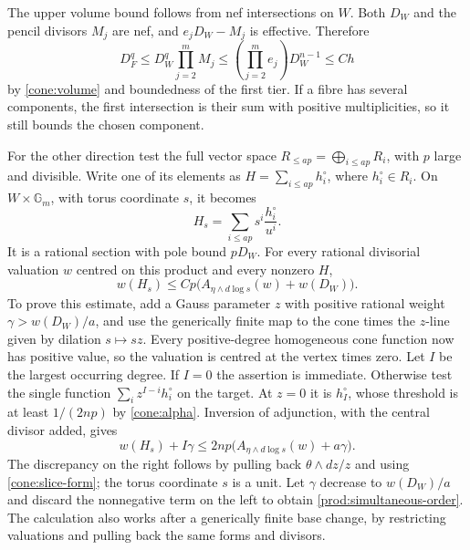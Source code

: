 The upper volume bound follows from nef intersections on $W$.
Both $D_W$ and the pencil divisors $M_j$ are nef, and
$e_jD_W-M_j$ is effective.  Therefore
\[
 D_F^q\leq D_W^q\prod_{j=2}^m M_j
 \leq\left(\prod_{j=2}^m e_j\right)D_W^{n-1}
 \leq Ch
\]
by \eqref{cone:volume} and boundedness of the first tier.  If a fibre
has several components, the first intersection is their sum with
positive multiplicities, so it still bounds the chosen component.

For the other direction test the full vector space
$R_{\leq ap}=\bigoplus_{i\leq ap}R_i$, with $p$ large and divisible.
Write one of its elements as $H=\sum_{i\leq ap}h_i^\circ$, where
$h_i^\circ\in R_i$.  On $W\times\mathbb G_m$, with torus coordinate
$s$, it becomes
\begin{equation}\label{prod:test-functions}
 H_s=\sum_{i\leq ap}s^i\frac{h_i^\circ}{u^i}.
\end{equation}
It is a rational section with pole bound $pD_W$.  For every rational
divisorial valuation $w$ centred on this product and every nonzero $H$,
\begin{equation}\label{prod:simultaneous-order}
 w(H_s)\leq Cp\bigl(A_{\eta\wedge d\log s}(w)+w(D_W)\bigr).
\end{equation}
To prove this estimate, add a Gauss parameter $z$ with positive rational
weight $\gamma>w(D_W)/a$, and use the generically finite map to the
cone times the $z$-line given by dilation $s\mapsto sz$.  Every
positive-degree homogeneous cone function now has positive value, so
the valuation is centred at the vertex times zero.  Let $I$ be the
largest occurring degree.  If $I=0$ the assertion is immediate.
Otherwise test the single function
$\sum_i z^{I-i}h_i^\circ$ on the target.  At $z=0$ it is $h_I^\circ$,
whose threshold is at least $1/(2np)$ by \eqref{cone:alpha}.
Inversion of adjunction, with the central divisor added, gives
\[
 w(H_s)+I\gamma
 \leq 2np\bigl(A_{\eta\wedge d\log s}(w)+a\gamma\bigr).
\]
The discrepancy on the right follows by pulling back
$\theta\wedge dz/z$ and using \eqref{cone:slice-form}; the torus
coordinate $s$ is a unit.  Let $\gamma$ decrease to $w(D_W)/a$ and
discard the nonnegative term on the left to obtain
\eqref{prod:simultaneous-order}.  The calculation also works after a
generically finite base change, by restricting valuations and pulling
back the same forms and divisors.

